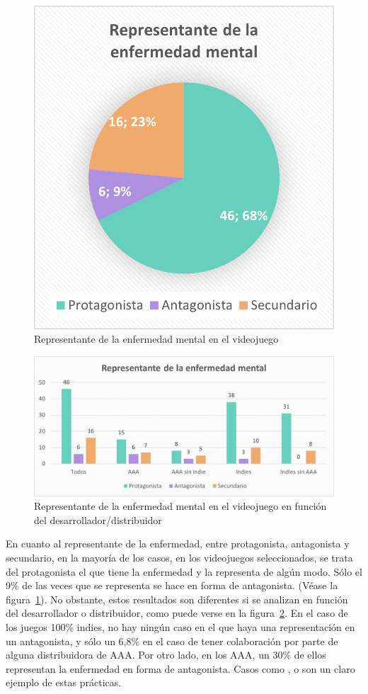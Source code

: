 \documentclass[12pt, a4paper,twoside,titlepage]{book}
\begin{document}
\begin{figure}
	\centering
	\includegraphics[width=.6\linewidth]{Graficas estudio/G11; Representante.png}
	\caption{Representante de la enfermedad mental en el videojuego}
	\label{fig:ESTRepresentante}
\end{figure}


\begin{figure}
	\centering
	\includegraphics[width=.8\linewidth]{Graficas estudio/G12; RepresentanteVS.png}
	\caption{Representante de la enfermedad mental en el videojuego en función del desarrollador/distribuidor}
	\label{fig:ESTRepresentanteVS}
\end{figure}



En cuanto al representante de la enfermedad, entre protagonista, antagonista y secundario, en la mayoría de los casos, en los videojuegos seleccionados, se trata del protagonista el que tiene la enfermedad y la representa de algún modo. Sólo el 9\% de las veces que se representa se hace en forma de antagonista. (Véase la figura~\ref{fig:ESTRepresentante}). No obstante, estos resultados son diferentes si se analizan en función del desarrollador o distribuidor, como puede verse en la figura~\ref{fig:ESTRepresentanteVS}. En el caso de los juegos 100\% indies, no hay ningún caso en el que haya una representación en un antagonista, y sólo un 6,8\% en el caso de tener colaboración por parte de alguna distribuidora de AAA. Por otro lado, en los AAA, un 30\% de ellos representan la enfermedad en forma de antagonista. Casos como ,  o  son un claro ejemplo de estas prácticas. 	   
 
\end{document}
